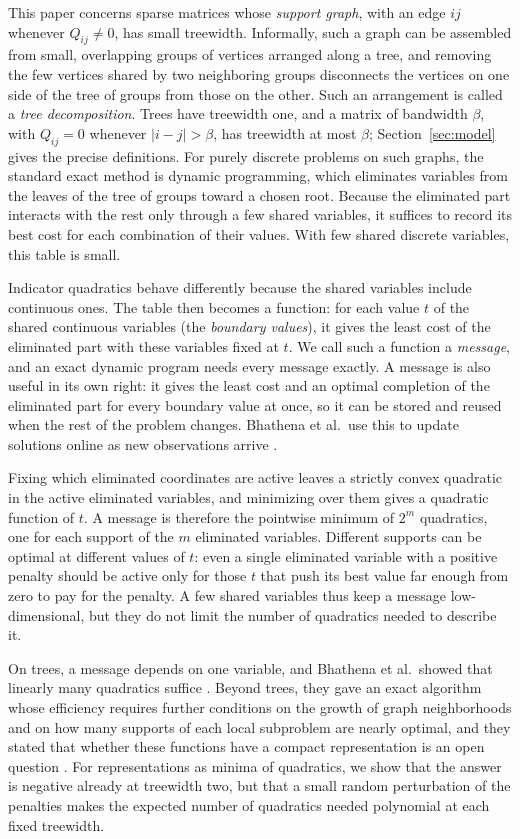 This paper concerns sparse matrices whose \emph{support graph}, with an
edge $ij$ whenever $Q_{ij}\ne0$, has small treewidth. Informally, such a
graph can be assembled from small, overlapping groups of vertices
arranged along a tree, and removing the few vertices shared by two
neighboring groups disconnects the vertices on one side of the tree of
groups from those on the other. Such an arrangement is called a
\emph{tree decomposition}. Trees have treewidth one, and a matrix of
bandwidth $\beta$, with $Q_{ij}=0$ whenever $|i-j|>\beta$, has treewidth
at most $\beta$; Section~\ref{sec:model} gives the precise definitions.
For purely discrete problems on such graphs, the standard exact method
is dynamic programming, which eliminates variables from the leaves of
the tree of groups toward a chosen root. Because the eliminated part
interacts with the rest only through a few shared variables, it suffices
to record its best cost for each combination of their values. With few
shared discrete variables, this table is small.

Indicator quadratics behave differently because the shared variables
include continuous ones. The table then becomes a function: for each
value $t$ of the shared continuous variables (the \emph{boundary
values}), it gives the least cost of the eliminated part with these
variables fixed at $t$. We call such a function a \emph{message}, and an
exact dynamic program needs every message exactly. A message is also
useful in its own right: it gives the least cost and an optimal
completion of the eliminated part for every boundary value at once, so
it can be stored and reused when the rest of the problem changes.
Bhathena et al.\ use this to update solutions online as new observations
arrive \cite{BhathenaTrees}.

Fixing which eliminated coordinates are active leaves a strictly convex
quadratic in the active eliminated variables, and minimizing over them
gives a quadratic function of $t$. A message is therefore the pointwise
minimum of $2^m$ quadratics, one for each support of the $m$ eliminated
variables. Different supports can be optimal at different values of $t$:
even a single eliminated variable with a positive penalty should be
active only for those $t$ that push its best value far enough from zero
to pay for the penalty. A few shared variables thus keep a message
low-dimensional, but they do not limit the number of quadratics needed
to describe it.

On trees, a message depends on one variable, and Bhathena et al.\ showed
that linearly many quadratics suffice \cite{BhathenaTrees}. Beyond
trees, they gave an exact algorithm whose efficiency requires further
conditions on the growth of graph neighborhoods and on how many supports
of each local subproblem are nearly optimal, and they stated that
whether these functions have a compact representation is an open
question \cite[Section~2.2]{BhathenaStructured}. For representations as
minima of quadratics, we show that the answer is negative already at
treewidth two, but that a small random perturbation of the penalties
makes the expected number of quadratics needed polynomial at each fixed
treewidth.

